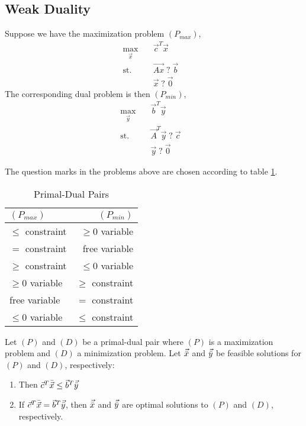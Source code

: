 \subsection{Weak Duality}
Suppose we have the maximization problem $(P_{max})$,
\begin{align}
        \max_{\Vec{x}} \quad & \Vec{c}^T\Vec{x} & \\
        \text{st.} \quad & \Vec{Ax}\; ?\; \Vec{b} &  \\
         & \Vec{x}\; ?\; \Vec{0}
\end{align}
The corresponding dual problem is then $(P_{min})$,
\begin{align}
        \max_{\Vec{y}} \quad & \Vec{b}^T\Vec{y} & \\
        \text{st.} \quad & \Vec{A}^T\Vec{y}\; ?\; \Vec{c} &  \\
         & \Vec{y}\; ?\; \Vec{0}
\end{align}

The question marks in the problems above are chosen according to table \ref{tab:primal-dual-pairs}.
\begin{table}[h!]
    \centering
    \begin{tabular}{l|r}
         $(P_{max})$ & $(P_{min})$ \\
         \hline
         $\leq$ constraint & $\geq 0$ variable \\ 
         $=$ constraint & free variable \\
         $\geq$ constraint & $\leq 0$ variable \\
         $\geq 0$ variable & $\geq$ constraint \\ 
         free variable & $=$ constraint \\ 
         $\leq 0$ variable & $\leq$ constraint 
    \end{tabular}
    \caption{Primal-Dual Pairs}
    \label{tab:primal-dual-pairs}
\end{table}


\begin{theorem}
Let $(P)$ and $(D)$ be a primal-dual pair where $(P)$ is a maximization problem and $(D)$ a minimization problem. Let $\Vec{\Bar{x}}$ and $\Vec{\Bar{y}}$ be feasible solutions for $(P)$ and $(D)$, respectively:
\begin{enumerate}
    \item Then $\Vec{c}^T\Bar{\Vec{x}}\leq\Vec{b}^T\Vec{\Bar{y}}$
    \item If $\Vec{c}^T\Bar{\Vec{x}}=\Vec{b}^T\Vec{\Bar{y}}$, then $\Vec{\Bar{x}}$ and $\Vec{\Bar{y}}$ are optimal solutions to $(P)$ and $(D)$, respectively.
\end{enumerate}
\end{theorem}


